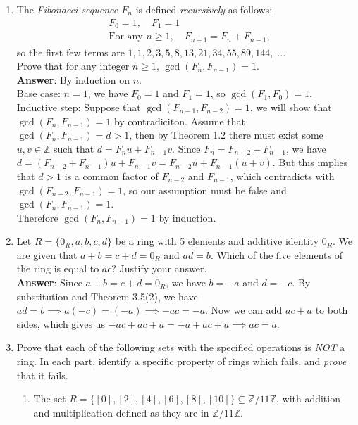 \documentclass{article}
\begin{document}
\begin{enumerate}
\begin{enumerate}
            \end{enumerate}
            \newpage
      \item The \textit{Fibonacci sequence $F_n$} is defined \textit{recursively} as follows:
            \begin{align*}  & F_0 = 1, \quad F_1 = 1 \\ & \text{For any } n \ge 1, \quad F_{n+1} = F_n + F_{n-1},\end{align*}
            so the first few terms are $1,1,2,3,5,8,13,21,34,55,89,144,\ldots.$\\
            Prove that for any integer $n\geq 1$, $\gcd(F_n,F_{n-1})=1$.\\
            \textbf{Answer}: By induction on $n$.\\
            Base case: $n=1$, we have $F_0=1$ and $F_1=1$, so $\gcd(F_1,F_0)=1$.\\
            Inductive step: Suppose that $\gcd(F_{n-1},F_{n-2})=1$, we will show that $\gcd(F_n,F_{n-1})=1$ by contradiciton. Assume that $\gcd(F_n,F_{n-1})=d>1$, then by Theorem 1.2 there must exist some $u,v\in\mathbb{Z}$ such that $d=F_nu+F_{n-1}v$. Since $F_n=F_{n-2}+F_{n-1}$, we have $d=(F_{n-2}+F_{n-1})u+F_{n-1}v=F_{n-2}u+F_{n-1}(u+v)$. But this implies that $d>1$ is a common factor of $F_{n-2}$ and $F_{n-1}$, which contradicts with $\gcd(F_{n-2},F_{n-1})=1$, so our assumption must be false and $\gcd(F_n,F_{n-1})=1$.\\
            Therefore $\gcd(F_n,F_{n-1})=1$ by induction.
            \newpage
      \item Let $R=\{0_R,a,b,c,d\}$ be a ring with 5 elements and additive identity $0_R$. We are given that $a+b=c+d=0_R$ and $ad=b$. Which of the five elements of the ring is equal to $ac$? Justify your answer.\\
            \textbf{Answer}: Since $a+b=c+d=0_R$, we have $b=-a$ and $d=-c$. By substitution and Theorem 3.5(2), we have $ad=b\implies a(-c)=(-a)\implies -ac=-a$. Now we can add $ac+a$ to both sides, which gives us $-ac+ac+a=-a+ac+a\implies ac=a$.
            \newpage
      \item Prove that each of the following sets with the specified operations is \textit{NOT} a ring. In each part, identify a specific property of rings which fails, and \textit{prove} that it fails.
            \begin{enumerate}
                  \item The set $R=\{[0],[2],[4],[6],[8],[10]\}\subseteq\mathbb{Z}/11\mathbb{Z}$, with addition and multiplication defined as they are in $\mathbb{Z}/11\mathbb{Z}$.\\

\end{enumerate}
\end{enumerate}
\end{document}
